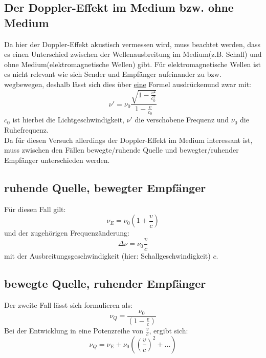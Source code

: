 \subsection{Der Doppler-Effekt im Medium bzw. ohne Medium}
Da hier der Doppler-Effekt akustisch vermessen wird, muss beachtet werden, dass es einen Unterschied zwischen der Wellenausbreitung im Medium(z.B. Schall) und ohne Medium(elektromagnetische Wellen) gibt. Für elektromagnetische Wellen ist es nicht relevant wie sich Sender und Empfänger aufeinander zu bzw. wegbewegen, deshalb lässt sich dies über \underline{eine} Formel ausdrückenund zwar mit:
\begin{equation}
\nu'=\nu_0 \frac{\sqrt{1-\frac{v^2}{c_0^2}}}{1-\frac{v}{c_0}} 
\end{equation}
$c_0$ ist hierbei die Lichtgeschwindigkeit, $\nu'$ die verschobene Frequenz und $\nu_0$ die Ruhefrequenz. \\
Da für diesen Versuch allerdings der Doppler-Effekt im Medium interessant ist, muss zwischen den Fällen bewegte/ruhende Quelle und bewegter/ruhender Empfänger unterschieden werden.
\subsection{ruhende Quelle, bewegter Empfänger}
Für diesen Fall gilt:
\begin{equation}
\nu_E=\nu_0 \left( 1+\frac{v}{c}\right) 
\end{equation}
und der zugehörigen Frequenzänderung:
\begin{equation}
\Delta\nu=\nu_0 \frac{v}{c}
\end{equation}
mit der Ausbreitungsgeschwindigkeit (hier: Schallgeschwindigkeit) $c$.
\subsection{bewegte Quelle, ruhender Empfänger}
Der zweite Fall lässt sich formulieren als:
\begin{equation}
\nu_Q=\frac{\nu_0}{(1-\frac{v}{c})}
\end{equation}
Bei der Entwicklung in eine Potenzreihe von $\frac{v}{c}$, ergibt sich:
\begin{equation}
\nu_Q=\nu_E + \nu_0\left( \left( \frac{v}{c}\right)^2+... \right) 
\end{equation}
